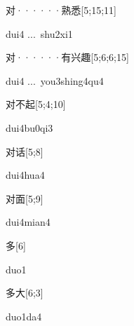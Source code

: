 \begin{verbete}{对······熟悉}[5;15;11]
\begin{pronuncia}[\\]{dui4 ...\  shu2xi1}
\end{pronuncia}
\end{verbete}

\begin{verbete}{对······有兴趣}[5;6;6;15]
\begin{pronuncia}[\\]{dui4 ...\  you3shing4qu4}
\end{pronuncia}
\end{verbete}

\begin{verbete}[dui4bu0qi3]{对不起}[5;4;10]
\begin{pronuncia}{dui4bu0qi3}
\end{pronuncia}
\end{verbete}

\begin{verbete}{对话}[5;8]
\begin{pronuncia}{dui4hua4}
\end{pronuncia}
\end{verbete}

\begin{verbete}{对面}[5;9]
\begin{pronuncia}{dui4mian4}
\end{pronuncia}
\end{verbete}

\begin{verbete}[duo1]{多}[6]
\begin{pronuncia}{duo1}
\end{pronuncia}
\end{verbete}

\begin{verbete}[duo1da4]{多大}[6;3]
\begin{pronuncia}{duo1da4}
\end{pronuncia}
\end{verbete}

